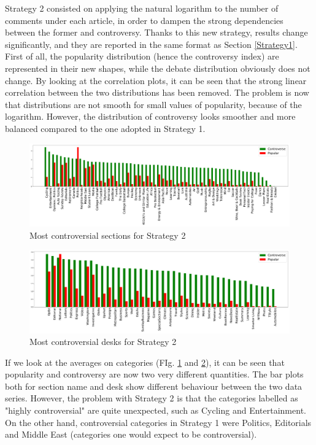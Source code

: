 Strategy 2 consisted on applying the natural logarithm to the number of comments under each article, in order to dampen the strong dependencies between the former and controversy. Thanks to this new strategy, results change significantly, and they are reported in the same format as Section \ref{Strategy1}.
First of all, the popularity distribution (hence the controversy index) are represented in their new shapes, while the debate distribution obviously does not change.
By looking at the correlation plots, it can be seen that the strong linear correlation between the two distributions has been removed. The problem is now that distributions are not smooth for small values of popularity, because of the logarithm. However, the distribution of controversy looks smoother and more balanced compared to the one adopted in Strategy 1.

\begin{figure}
\centering
\includegraphics[width=\tw]{Pictures/Strat2SN.pdf}
\caption{Most controversial sections for Strategy 2}
\label{RG2}
\end{figure}

\begin{figure}
\centering
\includegraphics[width=\tw]{Pictures/Strat2ND.pdf}
\caption{Most controversial desks for Strategy 2}
\label{RG2nd}
\end{figure}

If we look at the averages on categories (FIg. \ref{RG2} and \ref{RG2nd}), it can be seen that popularity and controversy are now two very different quantities. The bar plots both for section name and desk show different behaviour between the two data series. However, the problem with Strategy 2 is that the categories labelled as "highly controversial" are quite unexpected, such as Cycling and Entertainment. On the other hand, controversial categories in Strategy 1 were Politics, Editorials and Middle East (categories one would expect to be controversial).


